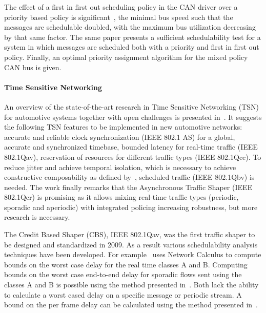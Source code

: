 The effect of a first in first out scheduling policy in the CAN driver over a priority based policy is significant~\cite{davis2011controller}, the minimal bus speed such that the messages are schedulable doubled, with the maximum bus utilization decreasing by that same factor. The same paper presents a sufficient schedulability test for a system in which messages are scheduled both with a priority and first in first out policy. Finally, an optimal priority assignment algorithm for the mixed policy CAN bus is given.

\paragraph{Time Sensitive Networking}
An overview of the state-of-the-art research in Time Sensitive Networking (TSN) for automotive systems together with open challenges is presented in~\cite{ashjaei2021time}. It suggests the following TSN features to be implemented in new automotive networks: accurate and reliable clock synchronization (IEEE 802.1 AS) for a global, accurate and synchronized timebase, bounded latency for real-time traffic (IEEE 802.1Qav), reservation of resources for different traffic types (IEEE 802.1Qcc). To reduce jitter and achieve temporal isolation, which is necessary to achieve constructive composability as defined by~\cite{kopetz2003time}, scheduled traffic (IEEE 802.1Qbv) is needed. The work finally remarks that the Asynchronous Traffic Shaper (IEEE 802.1Qcr) is promising as it allows mixing real-time traffic types (periodic, sporadic and aperiodic) with integrated policing increasing robustness, but more research is necessary.

The Credit Based Shaper (CBS), IEEE 802.1Qav, was the first traffic shaper to be designed and standardized in 2009. As a result various schedulability analysis techniques have been developed. For example~\cite{de2014complete} uses Network Calculus to compute bounds on the worst case delay for the real time classes A and B. Computing bounds on the worst case end-to-end delay for sporadic flows sent using the classes A and B is possible using the method presented in~\cite{li2017deterministic}. Both lack the ability to calculate a worst cased delay on a specific message or periodic stream. A bound on the per frame delay can be calculated using the method presented in~\cite{cao2016independent}. 


